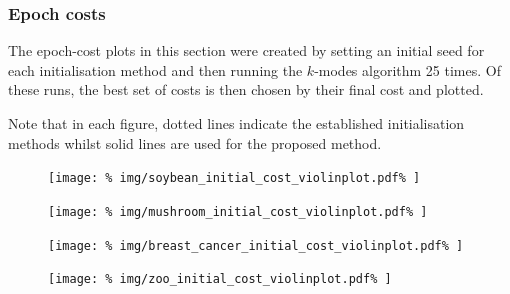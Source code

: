 \subsubsection{Epoch costs}

The epoch-cost plots in this section were created by setting an initial seed for
each initialisation method and then running the \(k\)-modes algorithm 25 times.
Of these runs, the best set of costs is then chosen by their final cost and
plotted.

Note that in each figure, dotted lines indicate the established initialisation
methods whilst solid lines are used for the proposed method.

\begin{figure}
    \centering
    \texttt{[image: \%
        img/soybean\_initial\_cost\_violinplot.pdf\%
    ]}
\end{figure}

\begin{figure}
    \centering
    \texttt{[image: \%
        img/mushroom\_initial\_cost\_violinplot.pdf\%
    ]}
\end{figure}

\begin{figure}
    \centering
    \texttt{[image: \%
        img/breast\_cancer\_initial\_cost\_violinplot.pdf\%
    ]}
\end{figure}

\begin{figure}
    \centering
    \texttt{[image: \%
        img/zoo\_initial\_cost\_violinplot.pdf\%
    ]}
\end{figure}
